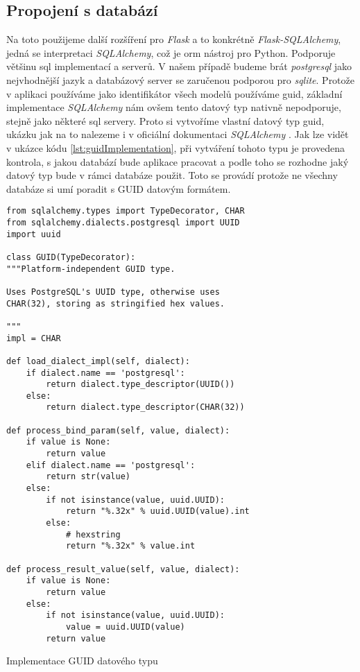 \subsection{Propojení s databází}

Na toto použijeme další rozšíření pro \textit{Flask} a to konkrétně \textit{Flask-SQLAlchemy}, jedná se interpretaci \textit{SQLAlchemy}, což je \gls{orm} nástroj pro Python.
Podporuje většinu \gls{sql} implementací a serverů. V našem případě budeme brát \textit{postgresql} jako nejvhodnější jazyk a databázový server se zaručenou podporou pro \textit{sqlite}. Protože
v aplikaci používáme jako identifikátor všech modelů používáme \gls{guid}, základní implementace \textit{SQLAlchemy} nám ovšem tento datový typ nativně nepodporuje, stejně jako
některé \gls{sql} servery. Proto si vytvoříme vlastní datový typ \gls{guid}, ukázku jak na to nalezeme i v oficiální dokumentaci \textit{SQLAlchemy} \cite{sqlalchemyGuid}. Jak lze
vidět v ukázce kódu \ref{lst:guidImplementation}, při vytváření tohoto typu je provedena kontrola, s jakou databází bude aplikace pracovat a podle toho se rozhodne jaký datový typ
bude v rámci databáze použit. Toto se provádí protože ne všechny databáze si umí poradit s GUID datovým formátem.

\begin{listing}
    \begin{verbatim}
from sqlalchemy.types import TypeDecorator, CHAR
from sqlalchemy.dialects.postgresql import UUID
import uuid

class GUID(TypeDecorator):
"""Platform-independent GUID type.

Uses PostgreSQL's UUID type, otherwise uses
CHAR(32), storing as stringified hex values.

"""
impl = CHAR

def load_dialect_impl(self, dialect):
    if dialect.name == 'postgresql':
        return dialect.type_descriptor(UUID())
    else:
        return dialect.type_descriptor(CHAR(32))

def process_bind_param(self, value, dialect):
    if value is None:
        return value
    elif dialect.name == 'postgresql':
        return str(value)
    else:
        if not isinstance(value, uuid.UUID):
            return "%.32x" % uuid.UUID(value).int
        else:
            # hexstring
            return "%.32x" % value.int

def process_result_value(self, value, dialect):
    if value is None:
        return value
    else:
        if not isinstance(value, uuid.UUID):
            value = uuid.UUID(value)
        return value
    \end{verbatim}
    \caption{Implementace GUID datového typu}
    \label{lst:guidImplementation}
\end{listing}

